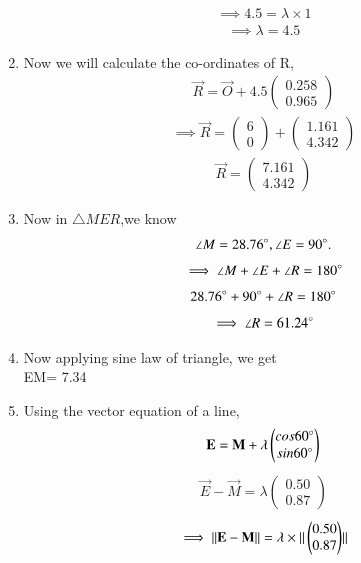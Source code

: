 \documentclass[journal,12pt,twocolumn]{IEEEtran}
\newcommand{\myvec}[1]{\ensuremath{\begin{pmatrix}#1\end{pmatrix}}}
\begin{document}
\begin{enumerate}
\begin{align}
\end{align}
\begin{align}
   \implies 4.5= \lambda \times 1
\end{align}
\begin{align}
    \implies \lambda = 4.5
\end{align}
\item Now we will calculate the co-ordinates of R,
\begin{align}
 \vec{R}= \vec{O}+ 4.5\myvec{0.258\\0.965}
 \end{align}
 \begin{align}
     \implies \vec{R}= \myvec{6\\0}+\myvec{1.161\\4.342}
 \end{align}
 \begin{align}
     \vec{R}= \myvec{7.161\\4.342}
 \end{align}
 \item Now in $\triangle MER$,we know
 \begin{align}
 \angle M=28.76\degree, \angle E=90\degree.
  \end{align}
 \begin{align}
     \implies \angle M+ \angle E+ \angle R= 180\degree
 \end{align}
 \begin{align}
     28.76\degree+90\degree+\angle R= 180\degree
 \end{align}
 \begin{align}
 \implies \angle R=61.24\degree
 \end{align}
 \item Now applying sine law of triangle, we get \\
 EM= 7.34\\
 \item Using the vector equation of a line, 
  \begin{align}
 \vec{E}= \vec{M}+ \lambda \myvec{cos60\degree \\ sin60\degree}
 \end{align}
 \begin{align}
       \vec{E}-\vec{M}= \lambda \myvec{0.50\\0.87}
 \end{align}
 \begin{align}
    \implies {\norm{\vec{E}-\vec{M}}}= \lambda \times{\norm{\myvec{0.50\\0.87}}}
\end{align}

\end{enumerate}
\end{document}
